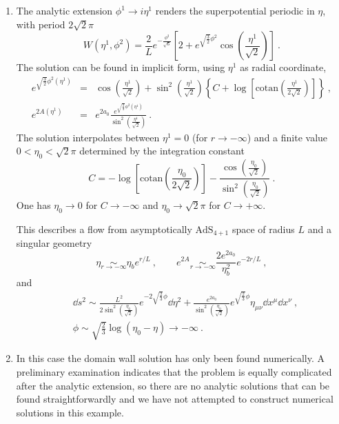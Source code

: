 \begin{enumerate}
	\item The analytic extension $\phi^1\to i\eta^1                     $ renders the superpotential periodic in $\eta$, with period $2\sqrt{2}\pi$
\begin{equation}\label{eq:supex3}
	W(\eta^1,\phi^2) = \frac{2}{L}e^{-\frac{\phi^2}{\sqrt{6}}} \left[2+e^{\sqrt{\frac{3}{2}}\phi^2}\cos\left(\frac{\eta^1}{\sqrt{2}}\right)\right]\ .
\end{equation}
The solution can be found in implicit form, using $\eta^1$ as radial coordinate,
\begin{subequations}
\begin{eqnarray}
	e^{\sqrt{\frac{3}{2}}\phi^2(\eta^1)} &=&\cos\left(\frac{\eta^1}{\sqrt{2}}\right)+\sin^2\left(\frac{\eta^1}{\sqrt{2}}\right)\left\{C+\log\left[\text{cotan}\left(\frac{\eta^1}{2\sqrt{2}}\right)\right]\right\}
	\ ,\\
	e^{2A(\eta^1)} &=& e^{2a_0}\frac{e^{\sqrt{\frac{2}{3}}\phi^2(\eta^1)}}{\sin^2\left(\frac{\eta^1}{\sqrt{2}}\right)}\ .
\end{eqnarray}
\end{subequations}
The solution interpolates between $\eta^1=0$ (for $r\to -\infty$) and a finite value $0<\eta_0<\sqrt{2}\pi$ determined by the integration constant
\begin{equation}
	C=-\log\left[\text{cotan}\left(\frac{\eta_0}{2\sqrt{2}}\right)\right]-\frac{\cos\left(\frac{\eta_0}{\sqrt{2}}\right)}{\sin^2\left(\frac{\eta_0}{\sqrt{2}}\right)}\ .
\end{equation}
One has $\eta_0 \to 0$ for $C\to -\infty$ and $\eta_0 \to \sqrt{2}\pi$ for $C\to +\infty$.

This describes a flow from asymptotically $\text{AdS}_{4+1}$ space of radius $L$ and a singular geometry
\begin{equation}
	\eta \underset{r\to-\infty}{\sim} \eta_b e^{r/L}
	\ ,\qquad
	e^{2A} \underset{r\to-\infty}{\sim} \frac{2e^{2a_0}}{\eta_b^2}e^{-2r/L}\ ,
\end{equation}
and
\begin{align}
	&\dd s^2\sim \frac{L^2}{2\sin^2\left(\frac{\eta_0}{\sqrt{2}}\right)} e^{-2\sqrt{\frac{2}{3}}\phi}\dd\eta^2+\frac{e^{2a_0}}{\sin^2\left(\frac{\eta_0}{\sqrt{2}}\right)}e^{\sqrt{\frac{2}{3}}\phi}\eta_{\mu\nu}\dd x^\mu \dd x^\nu
	\ , \\ 
	&\phi\sim \sqrt{\frac{2}{3}}\log(\eta_0-\eta) \to -\infty\ .
\end{align}

	\item In this case the domain wall solution has only been found numerically. A preliminary examination indicates that the problem is equally complicated after the analytic extension, so there are no analytic solutions that can be found straightforwardly and we have not attempted to construct numerical solutions in this example.
    

\end{enumerate}
